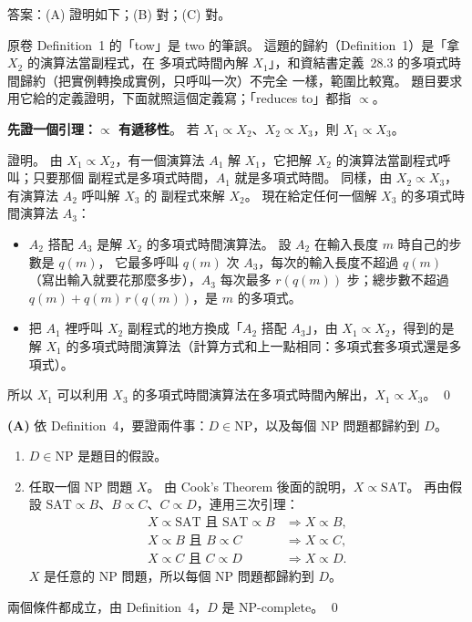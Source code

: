 \begin{pastsoln}
答案：(A) 證明如下；(B) 對；(C) 對。

原卷 Definition~1 的「tow」是 two 的筆誤。 這題的歸約（Definition~1）是「拿 $X_2$ 的演算法當副程式，在
多項式時間內解 $X_1$」，和資結書定義~28.3 的多項式時間歸約（把實例轉換成實例，只呼叫一次）不完全
一樣，範圍比較寬。 題目要求用它給的定義證明，下面就照這個定義寫；「reduces to」都指 $\propto$。

\textbf{先證一個引理：$\propto$ 有遞移性}。 若 $X_1 \propto X_2$、$X_2 \propto X_3$，則 $X_1 \propto X_3$。

證明。 由 $X_1 \propto X_2$，有一個演算法 $A_1$ 解 $X_1$，它把解 $X_2$ 的演算法當副程式呼叫；只要那個
副程式是多項式時間，$A_1$ 就是多項式時間。 同樣，由 $X_2 \propto X_3$，有演算法 $A_2$ 呼叫解 $X_3$ 的
副程式來解 $X_2$。 現在給定任何一個解 $X_3$ 的多項式時間演算法 $A_3$：
\begin{itemize}
\item $A_2$ 搭配 $A_3$ 是解 $X_2$ 的多項式時間演算法。 設 $A_2$ 在輸入長度 $m$ 時自己的步數是 $q(m)$，
它最多呼叫 $q(m)$ 次 $A_3$，每次的輸入長度不超過 $q(m)$（寫出輸入就要花那麼多步），$A_3$ 每次最多
$r(q(m))$ 步；總步數不超過 $q(m) + q(m)\,r(q(m))$，是 $m$ 的多項式。
\item 把 $A_1$ 裡呼叫 $X_2$ 副程式的地方換成「$A_2$ 搭配 $A_3$」，由 $X_1 \propto X_2$，得到的是解 $X_1$
的多項式時間演算法（計算方式和上一點相同：多項式套多項式還是多項式）。
\end{itemize}
所以 $X_1$ 可以利用 $X_3$ 的多項式時間演算法在多項式時間內解出，$X_1 \propto X_3$。 \qed

\textbf{(A)} 依 Definition~4，要證兩件事：$D \in \mathrm{NP}$，以及每個 NP 問題都歸約到 $D$。
\begin{enumerate}[label=(\arabic*)]
\item $D \in \mathrm{NP}$ 是題目的假設。
\item 任取一個 NP 問題 $X$。 由 Cook's Theorem 後面的說明，$X \propto \mathrm{SAT}$。 再由假設
$\mathrm{SAT} \propto B$、$B \propto C$、$C \propto D$，連用三次引理：
\[
\begin{aligned}
X \propto \mathrm{SAT} \text{ 且 } \mathrm{SAT} \propto B &\Rightarrow X \propto B,\\
X \propto B \text{ 且 } B \propto C &\Rightarrow X \propto C,\\
X \propto C \text{ 且 } C \propto D &\Rightarrow X \propto D.
\end{aligned}
\]
$X$ 是任意的 NP 問題，所以每個 NP 問題都歸約到 $D$。
\end{enumerate}
兩個條件都成立，由 Definition~4，$D$ 是 NP-complete。 \qed


\end{pastsoln}
